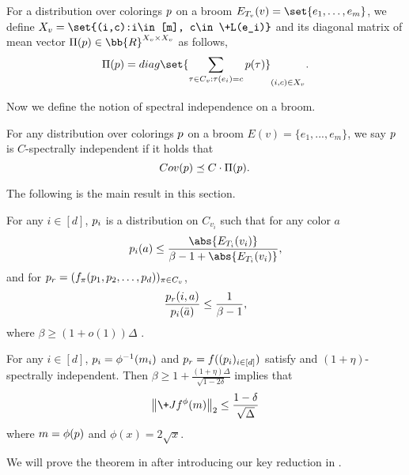 \begin{definition}\label{def:diag_mean}
    For a distribution over colorings $\*p$ on a broom $E_{T_v}(v)=\set{e_1,\dots,e_m}$, we define $X_v=\set{(i,c):i\in [m], c\in \+L(e_i)}$ and  its diagonal matrix of mean vector $\Pi(\*p)\in \bb{R}^{X_v\times X_v}$ as follows,
    $$
        \Pi(\*p) = \-{diag}\set{\sum_{\tau\in C_v: \tau(e_i) = c}\*p(\tau)}_{(i,c)\in X_v}.
    $$
\end{definition}
Now we define the notion of spectral independence on a broom.
\begin{definition}\label{def:sepctral_independence}
    For any distribution over colorings $\*p$ on a broom $E(v) = \{e_1,...,e_m\}$, we say $\*p$ is $C$-spectrally independent if it holds that
    $$
         \!{Cov}(\*p) \preceq C\cdot \Pi(\*p).
    $$
\end{definition}
The following is the main result in this section.
\begin{condition}\label{cond:marginal}
    For any $i\in [d]$, $\*p_i$ is a distribution on $C_{v_i}$ such that for any color $a$
\[
\*p_i(a)\leq \frac{\abs{E_{T_i}(v_i)}}{\beta -1 +\abs{E_{T_i}(v_i)}},
\]
and for $\*p_r = (f_\pi(\*p_1,\*p_2, \dots, \*p_d))_{\pi \in C_v}$,
\[
\frac{\*p_r(i,a)}{\*p_i(\bar{a})}\leq \frac{1}{\beta -1},
\]
where $\beta \geq (1+o(1))\Delta$ .
\end{condition}

\begin{theorem}\label{thm:bound_Jacobian}
    For any $i\in [d]$, $\*p_i = \phi^{-1}(\*m_i)$ and $\*p_r = f((\*p_i)_{i\in[d]})$ satisfy  and $(1 + \eta)$-spectrally independent. Then $\beta \geq 1 + \frac{(1 + \eta)\Delta}{\sqrt{1 - 2\delta}}$ implies that 
    $$
        \norm{\+J f^\phi(\*m)}_2 \leq \frac{1-\delta}{\sqrt \Delta}
    $$
    where $\*m = \phi(\*p)$ and $\phi(x) = 2\sqrt{x}$.
\end{theorem}

We will prove the theorem in  after introducing our key reduction in .

